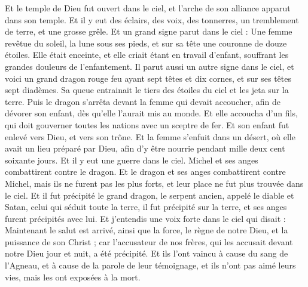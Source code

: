 \begin{multicols}{2}
Et le temple de Dieu fut ouvert dans le ciel, et l'arche de son alliance apparut dans son temple. Et il y eut des éclairs, des voix, des tonnerres, un tremblement de terre, et une grosse grêle.
\VerseOne{}Et un grand signe parut dans le ciel : Une femme revêtue du soleil, la lune sous ses pieds, et sur sa tête une couronne de douze étoiles.
Elle était enceinte, et elle criait étant en travail d'enfant, souffrant les grandes douleurs de l'enfantement.
Il parut aussi un autre signe dans le ciel, et voici un grand dragon rouge feu ayant sept têtes et dix cornes, et sur ses têtes sept diadèmes.
Sa queue entrainait le tiers des étoiles du ciel et les jeta sur la terre. Puis le dragon s'arrêta devant la femme qui devait accoucher, afin de dévorer son enfant, dès qu'elle l'aurait mis au monde.
Et elle accoucha d'un fils, qui doit gouverner toutes les nations avec un sceptre de fer. Et son enfant fut enlevé vers Dieu, et vers son trône.
Et la femme s'enfuit dans un désert, où elle avait un lieu préparé par Dieu, afin d'y être nourrie pendant mille deux cent soixante jours.
Et il y eut une guerre dans le ciel. Michel et ses anges combattirent contre le dragon. Et le dragon et ses anges combattirent contre Michel,
mais ils ne furent pas les plus forts, et leur place ne fut plus trouvée dans le ciel.
Et il fut précipité le grand dragon, le serpent ancien, appelé le diable et Satan, celui qui séduit toute la terre, il fut précipité sur la terre, et ses anges furent précipités avec lui.
Et j'entendis une voix forte dans le ciel qui disait : Maintenant le salut est arrivé, ainsi que la force, le règne de notre Dieu, et la puissance de son Christ ; car l'accusateur de nos frères, qui les accusait devant notre Dieu jour et nuit, a été précipité.
Et ils l'ont vaincu à cause du sang de l'Agneau, et à cause de la parole de leur témoignage, et ils n'ont pas aimé leurs vies, mais les ont exposées à la mort.

\end{multicols}

